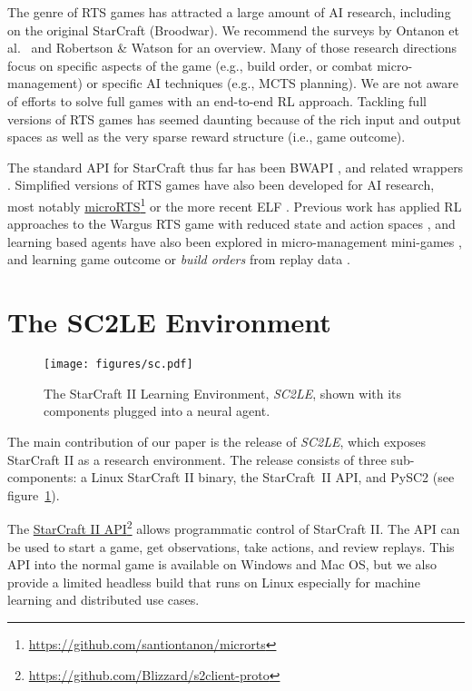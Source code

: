 \documentclass{article}
\newcommand{\footref}[2]{\href{#1}{#2}\footnote{\url{#1}}}
\begin{document}
The genre of RTS games has attracted a large amount of AI research, including on the original StarCraft (Broodwar). We recommend the surveys by Ontanon et al.~\cite{ontanon2013survey} and  Robertson \& Watson \cite{robertson2014review} for an overview. Many of those research directions focus on specific aspects of the game (e.g., build order, or combat micro-management) or specific AI techniques (e.g., MCTS planning). We are not aware of efforts to solve full games with an end-to-end RL approach. Tackling full versions of RTS games has seemed daunting because of the rich input and output spaces as well as the very sparse reward structure (i.e., game outcome).

The standard API for StarCraft thus far has been BWAPI \cite{BWAPI}, and related wrappers   \cite{synnaeve2016torchcraft}. Simplified versions of RTS games have also been developed for AI research, most notably \footref{https://github.com/santiontanon/microrts}{microRTS} or the more recent ELF \cite{tian2017elf}. Previous work has applied RL approaches to the Wargus RTS game with reduced state and action spaces \cite{jaidee2012classq}, and learning based agents have also been explored in micro-management mini-games \cite{peng2017multiagent, usunier2016episodic}, and learning game outcome or \emph{build orders} from replay data \cite{erickson2014global,justesen2017learning}. \section{The SC2LE Environment}\label{sec:env}
\begin{figure}
    \centering
    \texttt{[image: figures/sc.pdf]}
    \caption{The StarCraft II Learning Environment, \emph{SC2LE}, shown with its components plugged into a neural agent.
    }
    \label{fig:framework}
\end{figure}

The main contribution of our paper is the release of \emph{SC2LE}, which exposes StarCraft II as a research environment. The release consists of three sub-components: a Linux StarCraft II binary, the StarCraft~II API, and PySC2 (see figure~\ref{fig:framework}).

The \footref{https://github.com/Blizzard/s2client-proto}{StarCraft II API} allows programmatic control of StarCraft II. The API can be used to start a game, get observations, take actions, and review replays. This API into the normal game is available on Windows and Mac OS, but we also provide a limited headless build that runs on Linux especially for machine learning and distributed use cases.
\end{document}

